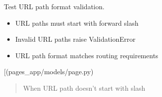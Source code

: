 \documentclass[letterpaper,10pt,english]{sphinxmanual}
\begin{document}
\begin{fulllineitems}
\begin{fulllineitems}
\end{fulllineitems}


\begin{fulllineitems}
\label{\detokenize{pages_app.tests:pages_app.tests.test_models.PageModelTest.test_url_path_validation}}
\pysigstartsignatures
\pysiglinewithargsret
{}
{}
{}
\pysigstopsignatures
\sphinxAtStartPar
Test URL path format validation.
\begin{description}
\begin{itemize}
\item {} 
\sphinxAtStartPar
URL paths must start with forward slash

\item {} 
\sphinxAtStartPar
Invalid URL paths raise ValidationError

\item {} 
\sphinxAtStartPar
URL path format matches routing requirements

\end{itemize}

\sphinxAtStartPar
{[}\sphinxtitleref{Page}{]}(pages\_app/models/page.py)

\end{description}
\begin{quote}\begin{description}
\sphinxAtStartPar
{} \textendash{} When URL path doesn’t start with slash

\end{description}\end{quote}

\end{fulllineitems}


\end{fulllineitems}

\end{document}
